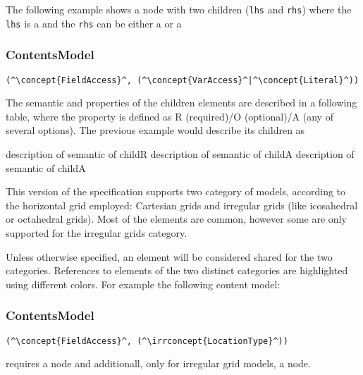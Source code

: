 The following example shows
a node with two children ({\tt lhs} and {\tt rhs}) where 
the {\tt lhs} is a  and the {\tt rhs} can be either a  or a  

\subsubsection*{ContentsModel}{}

\begin{lstlisting}[style=default,frame=none]
(^\concept{FieldAccess}^, (^\concept{VarAccess}^|^\concept{Literal}^))
\end{lstlisting}

The semantic and properties of the children elements are 
described in a following table, where the property is defined 
as R (required)/O (optional)/A (any of several options).
The previous example would describe its children as 

\begin{HIRChildElements}
	{description of semantic of child}{R}
	{description of semantic of child}{A}
	{description of semantic of child}{A}
\end{HIRChildElements}

This version of the specification supports two category of models, 
according to the horizontal grid employed: Cartesian grids and
irregular grids (like icosahedral or octahedral grids). 
Most of the elements are common, however some are only 
supported for the irregular grids category. 

Unless otherwise specified, an element will be considered 
shared for the two categories.
References to elements of the two distinct categories 
are highlighted using different colors. 
For example the following content model: 

\subsubsection*{ContentsModel}{}

\begin{lstlisting}[style=default,frame=none]
(^\concept{FieldAccess}^, (^\irrconcept{LocationType}^))
\end{lstlisting}

requires a  node and additionall, 
only for irregular grid models, a 
node.